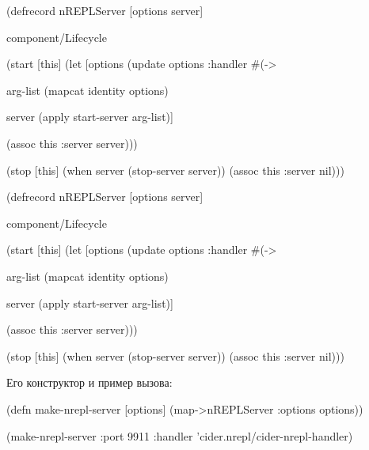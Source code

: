 \iflarge

\begin{english}
  \begin{clojure/lines}
(defrecord nREPLServer
    [options
     server]

  component/Lifecycle

  (start [this]
    (let [options
          (update options :handler #(-> %

          arg-list
          (mapcat identity options)

          server
          (apply start-server arg-list)]

      (assoc this :server server)))
  \end{clojure/lines}
\end{english}

\pagebreak[4]

\begin{english}
  \begin{clojure}
  (stop [this]
    (when server
      (stop-server server))
    (assoc this :server nil)))
  \end{clojure}
\end{english}

\else

\begin{english}
  \begin{clojure/lines}
(defrecord nREPLServer
    [options
     server]

  component/Lifecycle

  (start [this]
    (let [options
          (update options :handler #(-> %

          arg-list
          (mapcat identity options)

          server
          (apply start-server arg-list)]

      (assoc this :server server)))

  (stop [this]
    (when server
      (stop-server server))
    (assoc this :server nil)))
  \end{clojure/lines}
\end{english}

\fi

Его конструктор и пример вызова:

\begin{english}
  \begin{clojure}
(defn make-nrepl-server [options]
  (map->nREPLServer {:options options}))

(make-nrepl-server
 {:port 9911
  :handler 'cider.nrepl/cider-nrepl-handler})
  \end{clojure}
\end{english}


